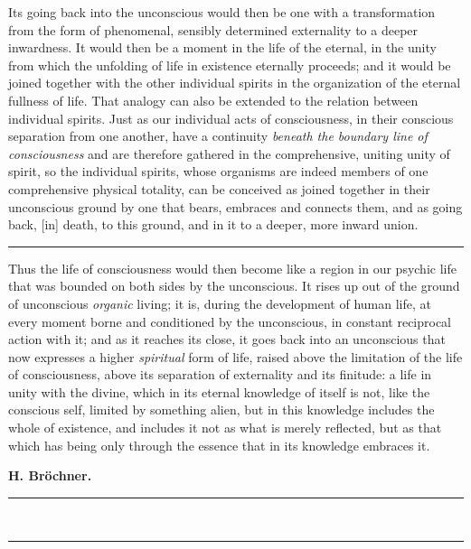 \documentclass[12pt,a4paper,openany]{book}
\newcommand{\opage}[1]{\marginnote{\footnotesize\textit{[#1]}}}
\begin{document}
Its going back into the unconscious would then be one with a
transformation from the form of phenomenal, sensibly determined
externality to a deeper inwardness. It would then
\opage{57}be a moment in the life of the eternal, in the unity from
which the unfolding of life in existence eternally proceeds; and it
would be joined together with the other individual spirits in the
organization of the eternal fullness of life. That analogy can also be
extended to the relation between individual spirits. Just as our
individual acts of consciousness, in their conscious separation from
one another, have a continuity \emph{beneath the boundary line of
consciousness} and are therefore gathered in the comprehensive,
uniting unity of spirit, so the individual spirits, whose organisms are
indeed members of one comprehensive physical totality, can be
conceived as joined together in their unconscious ground by one that
bears, embraces and connects them, and as going back, [in]
death, to this ground, and in it to a deeper, more inward union.

\begin{center}\rule{2cm}{0.4pt}\end{center}

Thus the life of consciousness would then become like a region in our
psychic life that was bounded on both sides by the unconscious. It
rises up out of the ground of unconscious \emph{organic} living; it is,
during the development of human life, at every moment borne and
conditioned by the unconscious, in constant reciprocal action with it;
and as it reaches its close, it goes back into an unconscious that now
expresses a higher \emph{spiritual} form of life, raised above the
limitation of the life of consciousness, above its separation of
externality and its finitude: a life in unity with the divine, which
in its eternal knowledge of itself is not, like the conscious self,
limited by something alien, but in this knowledge includes the whole
of existence, and includes it not as what is merely reflected, but as
that which has being only through the essence that in its knowledge
embraces it.

\begin{flushright}\textbf{H. Bröchner.}\end{flushright}
\begin{center}\rule{3cm}{0.4pt}\\[-10pt]\rule{3cm}{0.4pt}\end{center}
\end{document}
